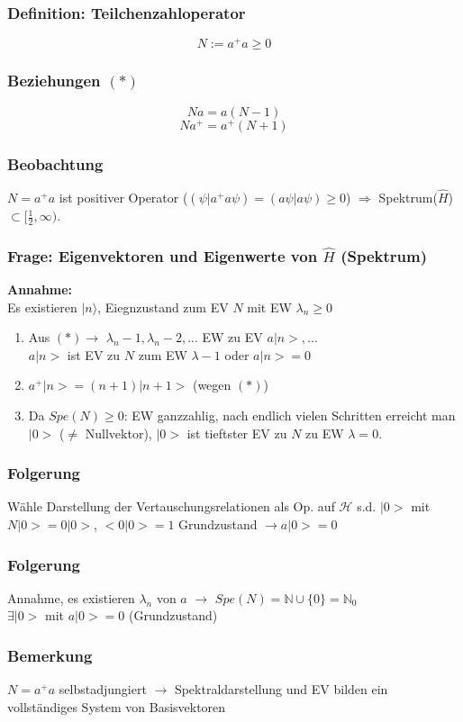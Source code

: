 \documentclass[twoside,a4paper]{scrartcl}
\renewcommand{\1}{\mathds{1}}
\newcommand{\Ra}{\Rightarrow}
\newcommand{\ra}{\rightarrow}
\renewcommand{\l}{\lambda}
\renewcommand{\H}{\mathcal{H}}
\begin{document}
\subsubsection*{Definition: Teilchenzahloperator} 
$$N:=a^+a\geq 0$$
\subsubsection*{Beziehungen $(*)$} 
$$Na=a(N-1)$$
$$Na^+=a^+(N+1)$$
\subsubsection*{Beobachtung} 
$N=a^+a$ ist positiver Operator ($(\psi|a^+a\psi)=(a\psi|a\psi)\geq0$) $\Ra$ Spektrum($\hat H$) $\subset [\frac{1}{2},\infty)$.

\subsubsection*{Frage: Eigenvektoren und Eigenwerte von $\hat H$ (Spektrum)} 
\textbf{Annahme:}\\
Es existieren $|n\rangle$, Eiegnzustand zum EV $N$ mit EW $\l_n\geq 0$\\
\begin{enumerate}
\item Aus $(*) \ra$ $\l_n-1,\l_n-2,...$ EW zu EV $a|n>,...$\\
$a|n>$ ist EV zu $N$ zum EW $\l-1$ oder $a|n>=0$
\item $a^+|n>=(n+1)|n+1>$ (wegen $(*)$)
\item Da $Spe(N)\geq 0$:
EW ganzzahlig, nach endlich vielen Schritten erreicht man $|0>$ ($\neq$ Nullvektor), $|0>$ ist tieftster EV zu $N$ zu EW $\l=0$.
\end{enumerate}
\subsubsection*{Folgerung} 
Wähle Darstellung der Vertauschungsrelationen als Op. auf $\H$ s.d. $|0>$ mit $N|0>=0|0>$, $<0|0>=1$ Grundzustand $\ra a|0>=0$

\subsubsection*{Folgerung} 
Annahme, es existieren $\l_n$ von $a$ $\ra$ $Spe(N)=\mathbb{N} \cup \{0\}=\mathbb{N}_0$\\
$\exists |0>$ mit $a|0>=0$ (Grundzustand)
\subsubsection*{Bemerkung} 
$N=a^+a$ selbstadjungiert $\ra$ Spektraldarstellung und EV bilden ein vollständiges System von Basisvektoren
\end{document}
